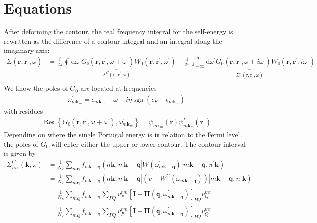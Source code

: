 \section{Equations}
After deforming the contour, the real frequency integral for the self-energy is rewritten as the difference of a contour integral and an integral along the imaginary axis:
\begin{align}
\Sigma\left(\mathbf{r}, \mathbf{r}^{\prime}, \omega\right) & =\underbrace{\frac{i}{2 \pi} \oint \mathrm{~d} \omega^{\prime} G_0\left(\mathbf{r}, \mathbf{r}^{\prime}, \omega+\omega^{\prime}\right) W_0\left(\mathbf{r}, \mathbf{r}^{\prime}, \omega^{\prime}\right)}_{\Sigma^C\left(\mathbf{r}, \mathbf{r}^{\prime}, \omega\right)} -\underbrace{\frac{1}{2 \pi} \int_{-\infty}^{\infty} \mathrm{d} \omega^{\prime} G_0\left(\mathbf{r}, \mathbf{r}^{\prime}, \omega+i \omega^{\prime}\right) W_0\left(\mathbf{r}, \mathbf{r}^{\prime}, i \omega^{\prime}\right)}_{\Sigma^I\left(\mathbf{r}, \mathbf{r}^{\prime}, \omega\right)} \\
\end{align}
We know the poles of $G_0$ are located at frequencies
\begin{align}
\omega_{m \mathbf{k}_m}^{\prime}=\epsilon_{m \mathbf{k}_m}-\omega+i \eta \operatorname{sgn}\left(\epsilon_F-\epsilon_{m \mathbf{k}_m}\right)
\end{align}
with residues
\begin{align}
\operatorname{Res}\left\{G_0\left(\mathbf{r},
\mathbf{r}^{\prime}, \omega+\omega^{\prime}\right), \omega_{m \mathbf{k}_m}^{\prime}\right\}=\psi_{m \mathbf{k}_m}(\mathbf{r}) \psi_{m \mathbf{k}_m}^*\left(\mathbf{r}^{\prime}\right)
\end{align}
Depending on where the single Portugal energy is in relation to the Fermi level, the poles of $G_0$ will enter either the upper or lower contour. The contour interval is given by
\begin{align}
\Sigma_{n n^{\prime}}^C(\mathbf{k}, \omega) & =\frac{1}{N_{\mathbf{k}}} \sum_{m \mathbf{q}} f_{m \mathbf{k}-\mathbf{q}} \left(n \mathbf{k}, m \mathbf{k}-\mathbf{q}\left|W\left(\omega_{m \mathbf{k}-\mathbf{q}}^{\prime}\right)\right| m \mathbf{k}-\mathbf{q}, n^{\prime} \mathbf{k}\right) \\
& =\frac{1}{N_{\mathbf{k}}} \sum_{m \mathbf{q}} f_{m \mathbf{k}-\mathbf{q}} \left(n \mathbf{k}, m \mathbf{k}-\mathbf{q}\left|\left(v+W^C\left(\omega_{m \mathbf{k}-\mathbf{q}}^{\prime}\right)\right)\right| m \mathbf{k}-\mathbf{q}, n^{\prime} \mathbf{k}\right) \\
& =\frac{1}{N_{\mathbf{k}}} \sum_{m \mathbf{q}} f_{m \mathbf{k}-\mathbf{q}} \sum_{P Q} v_P^{n m}\left[\mathbf{I}-\mathbf{\Pi}\left(\mathbf{q}, \omega_{m \mathbf{k}-\mathbf{q}}^{\prime}\right)\right]_{P Q}^{-1} v_Q^{m n^{\prime}}\\
& =\frac{1}{N_{\mathbf{k}}} \sum_{m \mathbf{q}} f_{m \mathbf{k}-\mathbf{q}} \sum_{P Q} v_P^{n m}\left[\mathbf{I}-\mathbf{\Pi}\left(\mathbf{q}, \omega_{m \mathbf{k}-\mathbf{q}}^{\prime}\right)\right]_{P Q}^{-1} v_Q^{m n^{\prime}}\\
\end{align}
